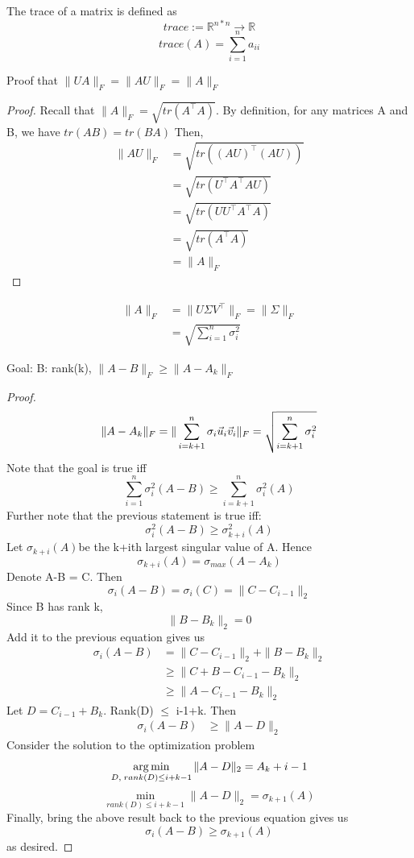 \begin{definition}[trace]
	The trace of a matrix is defined as
	\[
	trace := \mathbb{R}^{n*n} \rightarrow \mathbb{R}
	\]
	\[
trace(A) = \sum_{i=1}^na_{ii}
	\]
\end{definition}

\begin{remark}
	Proof that $\|UA\|_F = \|AU\|_F = \|A\|_F$
	\begin{proof}
		Recall that $\|A\|_F = \sqrt{tr(A^\top A)}$. By definition, for any matrices A and B, we have $tr(AB)=tr(BA)$ Then,
		\begin{align*}
			\|AU\|_F &= \sqrt{tr((AU)^\top(AU))}\\
			&= \sqrt{tr(U^\top A^\top AU)}\\
			&= \sqrt{tr(UU^\top A^\top A)}\\
			&= \sqrt{tr(A^\top A)}\\
			&= \|A\|_F
		\end{align*}
	\end{proof}
\end{remark}

\begin{remark}
\begin{align*}
	\|A\|_F &= \|U \Sigma V^\top\|_F = \|\Sigma\|_F\\
	&=\sqrt{\sum_{i=1}^n \sigma_i^2}
\end{align*}
\end{remark}

\begin{remark}
Goal: B: rank(k), $\|A-B\|_F \ge \|A-A_k\|_F$
\begin{proof}
\[
\|A-A_k\|_F = \|\sum_{i=k+1}^n \sigma_i\vec{u}_i\vec{v}_i\|_F = \sqrt{\sum_{i=k+1}^n \sigma_i^2}
\]
Note that the goal is true iff
\[
\sum_{i=1}^n \sigma_i^2(A-B) \ge \sum_{i=k+1}^n \sigma_i^2(A)
\]
Further note that the previous statement is true iff:
\[
\sigma_i^2(A-B) \ge \sigma_{k+i}^2(A)
\]
Let $\sigma_{k+i}(A)$be the k+ith largest singular value of A. Hence
\[
\sigma_{k+i}(A) = \sigma_{max}(A-A_k)
\]
Denote A-B = C. Then
\[
\sigma_i(A-B) = \sigma_i(C) = \|C-C_{i-1}\|_2
\]
Since B has rank k,
\[
\|B-B_k\|_2 = 0
\]
Add it to the previous equation gives us
\begin{align*}
	\sigma_i(A-B) &= \|C-C_{i-1}\|_2 + \|B-B_k\|_2\\
	&\ge \|C+B-C_{i-1}-B_k\|_2\\
	&\ge \|A-C_{i-1}-B_k\|_2
\end{align*}
Let $D = C_{i-1}+B_k$. Rank(D) $\le$ i-1+k. Then
\begin{align*}
	\sigma_i(A-B) &\ge \|A-D\|_2
\end{align*}
Consider the solution to the optimization problem
\[
\operatorname*{arg\,min}_{D, \;rank(D)\le i+k-1}\|A-D\|_2=A_k+i-1
\]
\[
\min_{rank(D)\le i+k-1}\|A-D\|_2 = \sigma_{k+1}(A)
\]
Finally, bring the above result back to the previous equation gives us
\[
\sigma_i(A-B) \ge \sigma_{k+1}(A)
\]
as desired.
\end{proof}
\end{remark}



